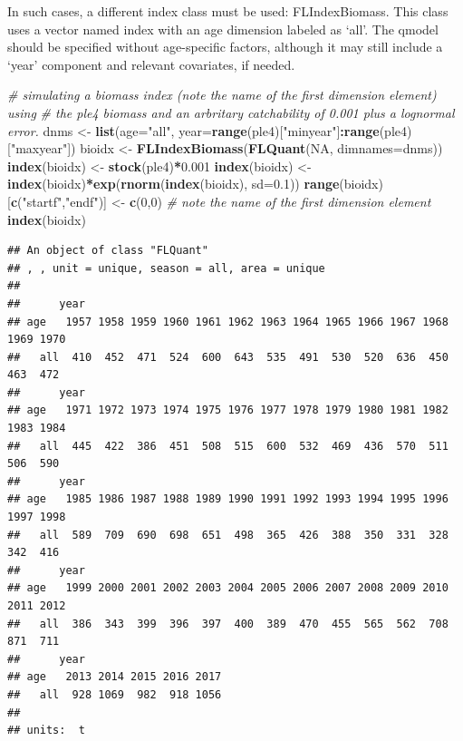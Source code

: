 \documentclass[
]{book}
\newenvironment{Shaded}{\begin{snugshade}}{\end{snugshade}}
\newcommand{\AttributeTok}[1]{\textcolor[rgb]{0.13,0.29,0.53}{#1}}
\newcommand{\CommentTok}[1]{\textcolor[rgb]{0.56,0.35,0.01}{\textit{#1}}}
\newcommand{\ConstantTok}[1]{\textcolor[rgb]{0.56,0.35,0.01}{#1}}
\newcommand{\DecValTok}[1]{\textcolor[rgb]{0.00,0.00,0.81}{#1}}
\newcommand{\FloatTok}[1]{\textcolor[rgb]{0.00,0.00,0.81}{#1}}
\newcommand{\FunctionTok}[1]{\textcolor[rgb]{0.13,0.29,0.53}{\textbf{#1}}}
\newcommand{\NormalTok}[1]{#1}
\newcommand{\OtherTok}[1]{\textcolor[rgb]{0.56,0.35,0.01}{#1}}
\newcommand{\SpecialCharTok}[1]{\textcolor[rgb]{0.81,0.36,0.00}{\textbf{#1}}}
\newcommand{\StringTok}[1]{\textcolor[rgb]{0.31,0.60,0.02}{#1}}
\begin{document}
In such cases, a different index class must be used: FLIndexBiomass. This class uses a vector named index with an age dimension labeled as `all'. The qmodel should be specified without age-specific factors, although it may still include a `year' component and relevant covariates, if needed.

\begin{Shaded}
\begin{Highlighting}[]
\CommentTok{\# simulating a biomass index (note the name of the first dimension element) using}
\CommentTok{\# the ple4 biomass and an arbritary catchability of 0.001 plus a lognormal error.}
\NormalTok{dnms }\OtherTok{\textless{}{-}} \FunctionTok{list}\NormalTok{(}\AttributeTok{age=}\StringTok{"all"}\NormalTok{, }\AttributeTok{year=}\FunctionTok{range}\NormalTok{(ple4)[}\StringTok{"minyear"}\NormalTok{]}\SpecialCharTok{:}\FunctionTok{range}\NormalTok{(ple4)[}\StringTok{"maxyear"}\NormalTok{])}
\NormalTok{bioidx }\OtherTok{\textless{}{-}} \FunctionTok{FLIndexBiomass}\NormalTok{(}\FunctionTok{FLQuant}\NormalTok{(}\ConstantTok{NA}\NormalTok{, }\AttributeTok{dimnames=}\NormalTok{dnms))}
\FunctionTok{index}\NormalTok{(bioidx) }\OtherTok{\textless{}{-}} \FunctionTok{stock}\NormalTok{(ple4)}\SpecialCharTok{*}\FloatTok{0.001}
\FunctionTok{index}\NormalTok{(bioidx) }\OtherTok{\textless{}{-}} \FunctionTok{index}\NormalTok{(bioidx)}\SpecialCharTok{*}\FunctionTok{exp}\NormalTok{(}\FunctionTok{rnorm}\NormalTok{(}\FunctionTok{index}\NormalTok{(bioidx), }\AttributeTok{sd=}\FloatTok{0.1}\NormalTok{))}
\FunctionTok{range}\NormalTok{(bioidx)[}\FunctionTok{c}\NormalTok{(}\StringTok{"startf"}\NormalTok{,}\StringTok{"endf"}\NormalTok{)] }\OtherTok{\textless{}{-}} \FunctionTok{c}\NormalTok{(}\DecValTok{0}\NormalTok{,}\DecValTok{0}\NormalTok{)}
\CommentTok{\# note the name of the first dimension element}
\FunctionTok{index}\NormalTok{(bioidx)}
\end{Highlighting}
\end{Shaded}

\begin{verbatim}
## An object of class "FLQuant"
## , , unit = unique, season = all, area = unique
## 
##      year
## age   1957 1958 1959 1960 1961 1962 1963 1964 1965 1966 1967 1968 1969 1970
##   all  410  452  471  524  600  643  535  491  530  520  636  450  463  472
##      year
## age   1971 1972 1973 1974 1975 1976 1977 1978 1979 1980 1981 1982 1983 1984
##   all  445  422  386  451  508  515  600  532  469  436  570  511  506  590
##      year
## age   1985 1986 1987 1988 1989 1990 1991 1992 1993 1994 1995 1996 1997 1998
##   all  589  709  690  698  651  498  365  426  388  350  331  328  342  416
##      year
## age   1999 2000 2001 2002 2003 2004 2005 2006 2007 2008 2009 2010 2011 2012
##   all  386  343  399  396  397  400  389  470  455  565  562  708  871  711
##      year
## age   2013 2014 2015 2016 2017
##   all  928 1069  982  918 1056
## 
## units:  t
\end{verbatim}
\end{document}
